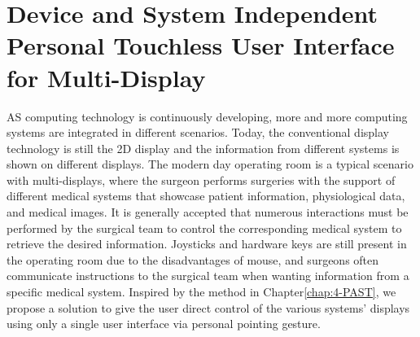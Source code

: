 %

\section{Device and System Independent Personal Touchless User Interface for Multi-Display}
AS computing technology is continuously developing, more and more computing systems are integrated in different scenarios. Today, the conventional display technology is still the 2D display and the information from different systems is shown on different displays. The modern day operating room is a typical scenario with multi-displays, where the surgeon performs surgeries with the support of different medical systems that showcase patient information, physiological data, and medical images. It is generally accepted that numerous interactions must be performed by the surgical team to control the corresponding medical system to retrieve the desired information. Joysticks and hardware keys are still present in the operating room due to the disadvantages of mouse, and surgeons often communicate instructions to the surgical team when wanting information from a specific medical system. Inspired by the method in Chapter\ref{chap:4-PAST}, we propose a solution to give the user direct control of the various systems' displays using only a single user interface via personal pointing gesture. 

